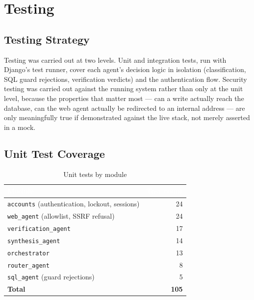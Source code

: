 \documentclass[11pt,a4paper,oneside]{report}
\begin{document}
\chapter{Testing}

\section{Testing Strategy}

Testing was carried out at two levels. Unit and integration tests, run with
Django's test runner, cover each agent's decision logic in isolation
(classification, SQL guard rejections, verification verdicts) and the
authentication flow. Security testing was carried out against the running
system rather than only at the unit level, because the properties that
matter most --- can a write actually reach the database, can the web agent
actually be redirected to an internal address --- are only meaningfully true
if demonstrated against the live stack, not merely asserted in a mock.

\section{Unit Test Coverage}

\begin{table}[h]
\centering
\caption{Unit tests by module}
\renewcommand{\arraystretch}{1.3}
\begin{tabularx}{\linewidth}{|X|r|}
\hline
\rowcolor{hdrnavy}
\textcolor{white}{Module} & \textcolor{white}{Test count} \\
\hline
\texttt{accounts} (authentication, lockout, sessions) & 24 \\
\hline
\texttt{web\_agent} (allowlist, SSRF refusal) & 24 \\
\hline
\texttt{verification\_agent} & 17 \\
\hline
\texttt{synthesis\_agent} & 14 \\
\hline
\texttt{orchestrator} & 13 \\
\hline
\texttt{router\_agent} & 8 \\
\hline
\texttt{sql\_agent} (guard rejections) & 5 \\
\hline
\rowcolor{hdrblue}
\textbf{Total} & \textbf{105} \\
\hline
\end{tabularx}
\end{table}
\end{document}
